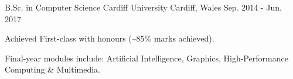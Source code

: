 \pagebreak


\begin{cventries}

  \cventry
    {B.Sc. in Computer Science} %
    {Cardiff University} %
    {Cardiff, Wales} %
    {Sep. 2014 - Jun. 2017} %
    {
      \begin{cvitems} %
        \item Achieved First-class with honours (\textasciitilde{}85\% marks achieved).
        \item Final-year modules include: Artificial Intelligence, Graphics, High-Performance Computing \& Multimedia.
      \end{cvitems}
    }
    {}


\end{cventries}
